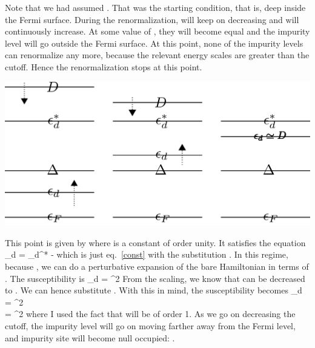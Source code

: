 \documentclass[14pt]{extarticle}
\numberwithin{equation}{section}
\begin{document}
{Note that we had assumed .
That was the starting condition, that is,  deep inside the Fermi surface.
During the renormalization,  will keep on decreasing and  will continuously increase.
At some value of , they will become equal and the impurity level will go outside the Fermi surface.
At this point, none of the impurity levels can renormalize any more, because the relevant energy scales are greater than the cutoff.
Hence the renormalization stops at this point.
\begin{center} \includegraphics[scale=0.29]{full.png}\end{center}
This point is given by  where  is a constant of order unity.
It satisfies the equation
\beq[eraser]
\ol \epsilon_d = \epsilon_d^* - \fr{\Delta}{\pi}\ln {}
\eeq
which is just eq.~\ref{const} with the substitution .
In this regime, because , we can do a perturbative expansion of the  bare Hamiltonian in terms of .
The susceptibility is
\beq
\chi_d = \fr{\Delta}{2\pi}^2
\eeq
From the scaling, we know that  can be decreased to .
We can hence substitute .
With this in mind, the susceptibility becomes
\beq
\chi_d = \fr{\Delta}{2\pi}^2 \\
= \fr{\Delta}{2\pi}^2
\eeq
where I used the fact that  will be of order 1.
As we go on decreasing the cutoff, the impurity level will go on moving farther away from the Fermi level, and impurity site will become null occupied: .
}
\end{document}
